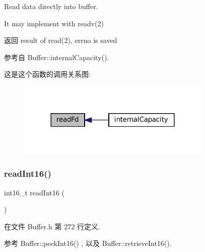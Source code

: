 Read data directly into buffer.

It may implement with readv(2) \begin{DoxyReturn}{返回}
result of read(2), {\ttfamily errno} is saved 
\end{DoxyReturn}


参考自 Buffer\+::internal\+Capacity().

这是这个函数的调用关系图\+:
\nopagebreak
\begin{figure}[H]
\begin{center}
\leavevmode
\includegraphics[width=263pt]{classmuduo_1_1net_1_1Buffer_abf4ee68d9e5290cdfb7f3854387f0576_icgraph}
\end{center}
\end{figure}
\mbox{\label{classmuduo_1_1net_1_1Buffer_a7cf018b7a5d7bed8aa4d201e4399fce0}} 
\subsubsection{\texorpdfstring{read\+Int16()}{readInt16()}}
{\footnotesize\ttfamily int16\+\_\+t read\+Int16 (\begin{DoxyParamCaption}{ }\end{DoxyParamCaption})\hspace{0.3cm}{\ttfamily [inline]}}



在文件 Buffer.\+h 第 272 行定义.



参考 Buffer\+::peek\+Int16() , 以及 Buffer\+::retrieve\+Int16().

